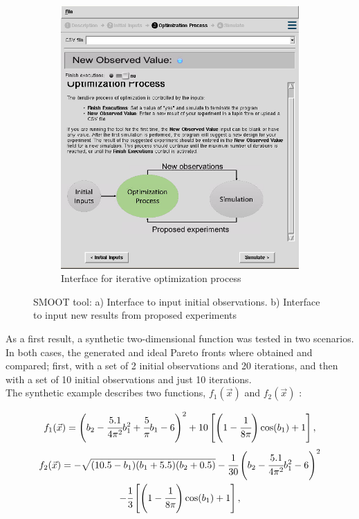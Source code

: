 \documentclass{article}
\begin{document}
\begin{figure}
\begin{subfigure}{0.45\textwidth}
        \includegraphics[width=\textwidth]{tool2}
        \caption{Interface for iterative optimization process}
        \label{tool_2}
    \end{subfigure}
\caption{SMOOT tool: a) Interface to input initial observations. b) Interface to input new results from proposed experiments}
\label{tool}
\end{figure}

As a first result, a synthetic two-dimensional function was tested in two scenarios. In both cases, the generated and ideal Pareto fronts where obtained and compared; first, with a set of 2 initial observations and 20 iterations, and then with a set of 10 initial observations and just 10 iterations.\\

The synthetic example describes two functions, $f_1(\vec{x})$ and $f_2(\vec{x})$ \cite{parr2013improvement}:

\begin{equation}\label{f1}
    f_1(\vec{x}) = \left( b_2 - \cfrac{5.1}{4\pi^2}b_1^2 + \cfrac{5}{\pi}b_1 - 6 \right)^2 + 10\left[ \left( 1 - \cfrac{1}{8\pi} \right)\cos(b_1) + 1 \right],
\end{equation}
\begin{multline}\label{f2}
    f_2(\vec{x}) = - \sqrt{(10.5-b_1)(b_1+5.5)(b_2+0.5)} - \cfrac{1}{30}\left( b_2 - \cfrac{5.1}{4\pi^2}b_1^2 - 6 \right)^2\\ - \cfrac{1}{3}\left[ \left( 1 - \cfrac{1}{8\pi} \right)\cos(b_1) + 1 \right],
\end{multline}
\end{document}
